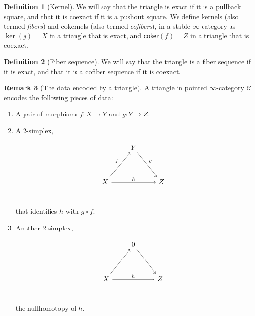 \documentclass[10pt]{amsart}
\newcommand{\8}{\ensuremath{\infty}}
\newcommand{\0}{\ensuremath{\overset{\rightarrow}{0}}}
\newcommand{\1}{\ensuremath{\mathbf{1}}}
\newcommand{\C}{\ensuremath{\mathscr{C}}}
\newcommand{\coker}{\ensuremath{\mathsf{coker}}}
\theoremstyle{definition}
\newtheorem{definition}{Definition}[section]
\newtheorem{remark}[definition]{Remark}
\numberwithin{definition}{subsection}
\numberwithin{definition}{section}
\begin{document}
\begin{definition}[Kernel]
  We will say that the triangle is exact if it is a pullback square, and that it is coexact if it is a pushout square. We define kernels (also termed \emph{fibers}) and cokernels (also termed \emph{cofibers}), in a stable \8-category as $\ker(g) = X$ in a triangle that is exact, and $\coker(f) = Z$ in a triangle that is coexact.
\end{definition}

\begin{definition}[Fiber sequence]
  We will say that the triangle is a fiber sequence if it is exact, and that it is a cofiber sequence if it is coexact.
\end{definition}

\begin{remark}[The data encoded by a triangle]
  A triangle in pointed \8-category $\C$ encodes the following pieces of data:

  \begin{enumerate}
    \item[(a)] A pair of morphisms $f : X \rightarrow Y$ and $g: Y \rightarrow Z$.
    \item[(b)] A 2-simplex,

      \begin{equation*}
        \begin{tikzcd}
          & Y \arrow[ddr, "g"] & \\
          \\
          X \arrow[uur, "f"] \arrow[rr, "h"] & & Z \\
        \end{tikzcd}
      \end{equation*}

      that identifies $h$ with  $g \circ f$.

    \item[(c)] Another 2-simplex,

      \begin{equation*}
        \begin{tikzcd}
          & 0 \arrow[ddr] & \\
          \\
          X \arrow[uur] \arrow[rr, "h"] & & Z \\
        \end{tikzcd}
      \end{equation*}

      the nullhomotopy of $h$.
  \end{enumerate}
\end{remark}
\end{document}
